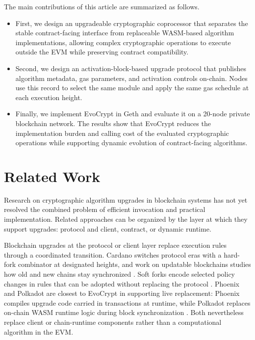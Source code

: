 \documentclass[runningheads]{llncs}
\begin{document}
The main contributions of this article are summarized as follows.
\begin{itemize}
    \item First, we design an upgradeable cryptographic coprocessor that separates the stable contract-facing interface from replaceable WASM-based algorithm implementations, allowing complex cryptographic operations to execute outside the EVM while preserving contract compatibility.
    \item Second, we design an activation-block-based upgrade protocol that publishes algorithm metadata, gas parameters, and activation controls on-chain. Nodes use this record to select the same module and apply the same gas schedule at each execution height.
    \item Finally, we implement EvoCrypt in Geth and evaluate it on a 20-node private blockchain network. The results show that EvoCrypt reduces the implementation burden and calling cost of the evaluated cryptographic operations while supporting dynamic evolution of contract-facing algorithms.
\end{itemize}

\section{Related Work}\label{sec2}

Research on cryptographic algorithm upgrades in blockchain systems has not yet resolved the combined problem of efficient invocation and practical implementation. Related approaches can be organized by the layer at which they support upgrades: protocol and client, contract, or dynamic runtime.

Blockchain upgrades at the protocol or client layer replace execution rules through a coordinated transition. Cardano switches protocol eras with a hard-fork combinator at designated heights, and work on updatable blockchains studies how old and new chains stay synchronized \cite{cardanoHardForkCombinator,cardanoEvolution,ciampi2020updatable}. Soft forks encode selected policy changes in rules that can be adopted without replacing the protocol \cite{zindros2021softPower}. Phoenix and Polkadot are closest to EvoCrypt in supporting live replacement: Phoenix compiles upgrade code carried in transactions at runtime, while Polkadot replaces on-chain WASM runtime logic during block synchronization \cite{wang2023phoenix,polkadotRuntimeUpgrades}. Both nevertheless replace client or chain-runtime components rather than a computational algorithm in the EVM.
\end{document}

